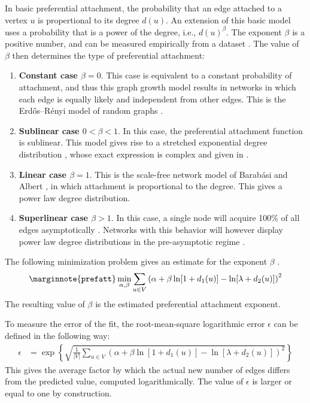 \documentclass{article}
\begin{document}
In basic preferential attachment, the probability that an edge
attached to a vertex $u$ is propertional to its degree $d(u)$.  An
extension of this basic model uses a probability that is a power of the
degree, i.e., $d(u)^\beta$.  The exponent $\beta$ is a positive number,
and can be measured empirically from a dataset
\cite{kunegis:preferential-attachment}.  The value of $\beta$ then
determines the type of preferential attachment:
\begin{enumerate}
\item \textbf{Constant case $\beta=0$}.  
This case is equivalent to a constant probability of attachment, 
and thus this graph growth model results in networks in which each edge
is equally likely and independent from other edges.  This is the
Erdős--Rényi model of random graphs \cite{b569}. 

\item \textbf{Sublinear case $0 < \beta < 1$}. 
In this case, the preferential attachment function is sublinear.  This
model gives rise to a stretched exponential degree distribution
\cite{b764}, whose exact 
expression is complex and given in \cite[Eq. 94]{b773}. 

\item \textbf{Linear case $\beta=1$}.
This is the scale-free network model of Barabási and Albert
\cite{b439}, in which attachment is proportional to the degree. This gives a
power law degree distribution.  

\item \textbf{Superlinear case $\beta > 1$}.
In this case, a single node will acquire 100\% of all edges
asymptotically \cite{b765}. Networks with this behavior will however display
power law degree distributions in the pre-asymptotic regime
\cite{b769}. 
\end{enumerate}

The following minimization problem gives an estimate for the exponent
$\beta$ \cite{kunegis:preferential-attachment}.
\begin{align}
  \marginnote{\texttt{prefatt}}
  \min_{\alpha,\beta} \sum_{u\in V} \left( \alpha + \beta \ln[1 + d_1(u)]
  - \ln[\lambda + d_2(u)]  \right)^2
  \label{eq:min}
\end{align}
The resulting value of $\beta$ is the estimated preferential attachment
exponent. 

To measure the error of the fit, the root-mean-square
logarithmic error $\epsilon$ can be defined in the following way: 
\begin{align*}
    \epsilon &= \exp\left\{ \sqrt{ \frac 1 {|V|} \sum_{u \in V}
      \left(\alpha + \beta \ln[1 
        + d_1(u)] - \ln[\lambda + d_2(u)]\right)^2  }  \right\}
\end{align*}
This gives the average factor by which the actual new number of edges
differs from the predicted value, computed logarithmically. 
The value of $\epsilon$ is larger or equal to one by construction. 
\end{document}
